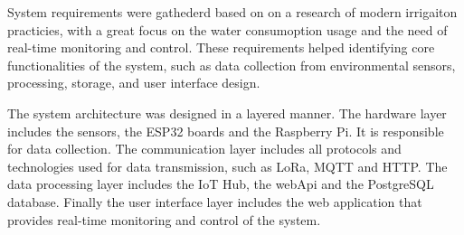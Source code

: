 System requirements were gathederd based on on a research of modern irrigaiton practicies, with a great focus on the water consumoption
usage and the need of real-time monitoring and control. These requirements helped identifying core functionalities of the system,
such as data collection from environmental sensors, processing, storage, and user interface design. 

The system architecture was designed in a layered manner. The hardware layer includes the sensors, the ESP32 boards
and the Raspberry Pi. It is responsible for data collection. The communication layer includes all protocols and technologies
used for data transmission, such as LoRa, MQTT and HTTP. The data processing layer includes the IoT Hub, the webApi and the PostgreSQL database.
Finally the user interface layer includes the web application that provides real-time monitoring and control of the system. 